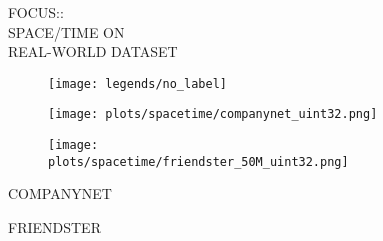 \documentclass{article}
\begin{document}
\begin{figure}[!htbp]
\fbox
{
\begin{minipage}[t][0.98\textheight][t]{\textwidth}
\centering
    \begin{minipage}{0.23\linewidth}
    \footnotesize{FOCUS::\\ SPACE/TIME ON \\ REAL-WORLD DATASET}
    \end{minipage}
   \begin{minipage}{0.75\linewidth}
        \begin{figure}[H]
        \texttt{[image: legends/no\_label]}
        \end{figure}
    \end{minipage}
   \vfill 

   \begin{minipage}{0.48\linewidth}
        \begin{figure}[H]
        \texttt{[image: plots/spacetime/companynet\_uint32.png]}
        \end{figure}
    \end{minipage}
    \begin{minipage}{0.48\linewidth}
        \begin{figure}[H]
        \texttt{[image: plots/spacetime/friendster\_50M\_uint32.png]}
        \end{figure}
    \end{minipage}
    \begin{minipage}{0.48\linewidth}
    \begin{center}
        COMPANYNET
    \end{center}
    \end{minipage}
    \begin{minipage}{0.48\linewidth}
    \begin{center}
        FRIENDSTER
    \end{center}
    \end{minipage}
    
    \vfill


\end{minipage}}
\end{figure}
\end{document}
